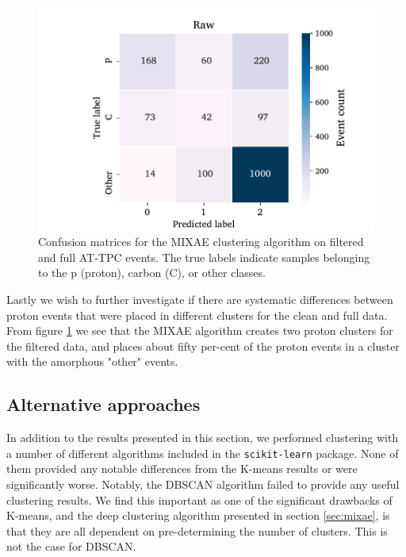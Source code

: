 \documentclass[review,number,sort&compress]{elsarticle}
\begin{document}
\begin{figure}[H]
\centering
	\includegraphics[width=\textwidth]{custom_work/Raw_mixae_conf_mat.pdf}
\caption[MIXAE - confusion matrices]{Confusion matrices for the MIXAE clustering algorithm on filtered and full AT-TPC events. The true labels indicate samples belonging to the p (proton), carbon (C), or other classes. }\label{fig:mixae_confmat}
\end{figure}

Lastly we wish to further investigate if there are systematic differences between proton events that were placed in different clusters for the clean and full data. From figure \ref{fig:mixae_confmat} we see that the MIXAE algorithm creates two proton clusters for the filtered data, and places about fifty per-cent of the proton events in a cluster with the amorphous "other" events.

\subsection{Alternative approaches}

In addition to the results presented in this section, we performed clustering with a number of different algorithms included in the \lstinline{scikit-learn} package. None of them provided any notable differences from the K-means results or were significantly worse. Notably, the DBSCAN algorithm \cite{Ester96adensity-based}\cite{Bergstra2012} failed to provide any useful clustering results. We find this important as one of the significant drawbacks of K-means, and the deep clustering algorithm presented in section \ref{sec:mixae}, is that they are all dependent on pre-determining the number of clusters. This is not the case for DBSCAN. 
\end{document}
